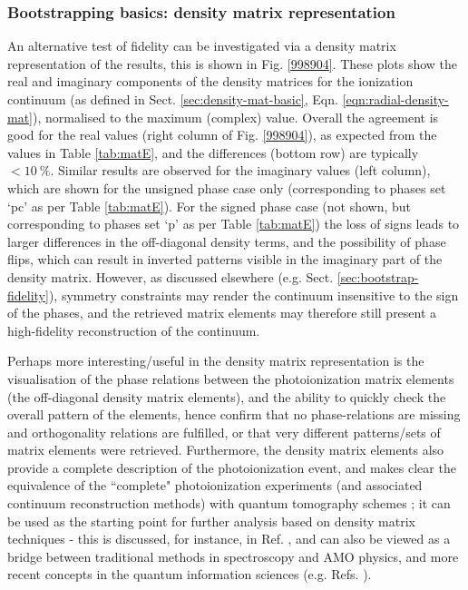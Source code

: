 \subsubsection{Bootstrapping basics: density matrix representation\label{sec:den-mat-N2}}

An alternative test of fidelity can be investigated via a density matrix representation of the results, this is shown in Fig. \ref{998904}. These plots show the real and imaginary components of the density matrices for the ionization continuum (as defined in Sect. \ref{sec:density-mat-basic}, Eqn. \ref{eqn:radial-density-mat}), normalised to the maximum (complex) value. Overall the agreement is good for the real values (right column of Fig. \ref{998904}), as expected from the values in Table \ref{tab:matE}, and the differences (bottom row) are typically $<10~\%$. Similar results are observed for the imaginary values (left column), which are shown for the unsigned phase case only (corresponding to phases set `pc' as per Table \ref{tab:matE}). For the signed phase case (not shown, but corresponding to phases set `p' as per Table \ref{tab:matE}) the loss of signs leads to larger differences in the off-diagonal density terms, and the possibility of phase flips, which 
can result in inverted patterns visible in the imaginary part of the density matrix. However, as discussed elsewhere (e.g. Sect. \ref{sec:bootstrap-fidelity}), symmetry constraints may render the continuum insensitive to the sign of the phases, and the retrieved matrix elements may therefore still present a high-fidelity reconstruction of the continuum.

Perhaps more interesting/useful in the density matrix representation is the visualisation of the phase relations between the photoionization matrix elements (the off-diagonal density matrix elements), and the ability to quickly check the overall pattern of the elements, hence confirm that no phase-relations are missing and orthogonality relations are fulfilled, or that very different patterns/sets of matrix elements were retrieved. Furthermore, the density matrix elements also provide a complete description of the photoionization event, and makes clear the equivalence of the ``complete" photoionization experiments (and associated continuum reconstruction methods) with quantum tomography schemes \cite{MauroDAriano2003}; it can be used as the starting point for further analysis based on density matrix techniques - this is discussed, for instance, in Ref. \cite{BlumDensityMat}, and can also be viewed as a bridge between traditional methods in spectroscopy and AMO physics, and more recent concepts in the quantum information sciences (e.g. Refs.  \cite{Tichy2011a,Yuen-Zhou2014}).

